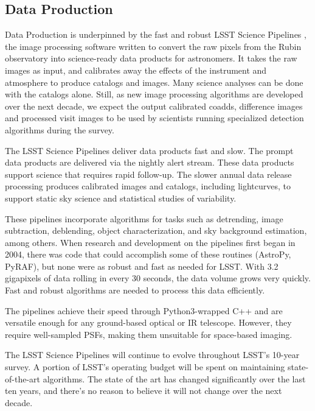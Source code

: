 \subsection{Data Production} \label{sec:dataproduction}

Data Production is underpinned by the fast and robust LSST Science Pipelines \citep{PSTN-019,2019ASPC..523..521B}, the image processing software written to convert the raw pixels from the Rubin observatory into science-ready data products for astronomers. It takes the raw images as input, and calibrates away the effects of the instrument and atmosphere to produce catalogs and images. Many science analyses can be done with the catalogs alone. Still, as new image processing algorithms are developed over the next decade, we expect the output calibrated coadds, difference images and processed visit images to be used by scientists running specialized detection algorithms during the survey.

The LSST Science Pipelines deliver data products fast and slow. The prompt data products are delivered via the nightly alert stream. These data products support science that requires rapid follow-up. The slower annual data release processing produces calibrated images and catalogs, including lightcurves, to support static sky science and statistical studies of variability.

These pipelines incorporate algorithms for tasks such as detrending, image subtraction, deblending, object characterization, and sky background estimation, among others. When research and development on the pipelines first began in 2004, there was code that could accomplish some of these routines (AstroPy, PyRAF), but none were as robust and fast as needed for LSST. With 3.2\,gigapixels of data rolling in every 30 seconds, the data volume grows very quickly. Fast and robust algorithms are needed to process this data efficiently.

The pipelines achieve their speed through Python3-wrapped C++ and are versatile enough for any ground-based optical or IR telescope. However, they require well-sampled PSFs, making them unsuitable for space-based imaging.

The LSST Science Pipelines will continue to evolve throughout LSST's 10-year survey. A portion of LSST's operating budget will be spent on maintaining state-of-the-art algorithms. The state of the art has changed significantly over the last ten years, and there's no reason to believe it will not change over the next decade.

